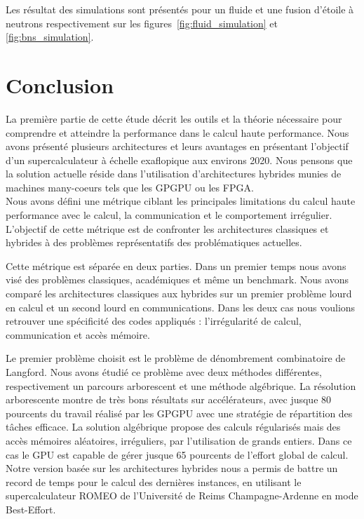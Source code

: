\documentclass[12pt,a4paper]{report}
\begin{document}
Les résultat des simulations sont présentés pour un fluide et une fusion d'étoile à neutrons respectivement sur les figures~\ref{fig:fluid_simulation} et \ref{fig:bns_simulation}.

\chapter*{Conclusion}
La première partie de cette étude décrit les outils et la théorie nécessaire pour comprendre et atteindre la performance dans le calcul haute performance. 
Nous avons présenté plusieurs architectures et leurs avantages en présentant l'objectif d'un supercalculateur à échelle exaflopique aux environs 2020. 
Nous pensons que la solution actuelle réside dans l'utilisation d'architectures hybrides munies de machines many-coeurs tels que les GPGPU ou les FPGA.\\

Nous avons défini une métrique ciblant les principales limitations du calcul haute performance avec le calcul, la communication et le comportement irrégulier. 
L'objectif de cette métrique est de confronter les architectures classiques et hybrides à des problèmes représentatifs des problématiques actuelles.

Cette métrique est séparée en deux parties. 
Dans un premier temps nous avons visé des problèmes classiques, académiques et même un benchmark. 
Nous avons comparé les architectures classiques aux hybrides sur un premier problème lourd en calcul et un second lourd en communications.
Dans les deux cas nous voulions retrouver une spécificité des codes appliqués : l'irrégularité de calcul, communication et accès mémoire.  

Le premier problème choisit est le problème de dénombrement combinatoire de Langford.
Nous avons étudié ce problème avec deux méthodes différentes, respectivement un parcours arborescent et une méthode algébrique. 
La résolution arborescente montre de très bons résultats sur accélérateurs, avec jusque 80 pourcents du travail réalisé par les GPGPU avec une stratégie de répartition des tâches efficace. 
La solution algébrique propose des calculs régularisés mais des accès mémoires aléatoires, irréguliers, par l'utilisation de grands entiers. 
Dans ce cas le GPU est capable de gérer jusque 65 pourcents de l'effort global de calcul. 
Notre version basée sur les architectures hybrides nous a permis de battre un record de temps pour le calcul des dernières instances, en utilisant le supercalculateur ROMEO de l'Université de Reims Champagne-Ardenne en mode Best-Effort. 
\end{document}

